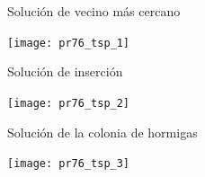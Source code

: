 \begin{frame}{Solución de vecino más cercano}
	\begin{center}
		\texttt{[image: pr76\_tsp\_1]}
	\end{center}
\end{frame}

\begin{frame}{Solución de inserción}
	\begin{center}
		\texttt{[image: pr76\_tsp\_2]}
	\end{center}
\end{frame}

\begin{frame}{Solución de la colonia de hormigas}
	\begin{center}
		\texttt{[image: pr76\_tsp\_3]}
	\end{center}
\end{frame}
